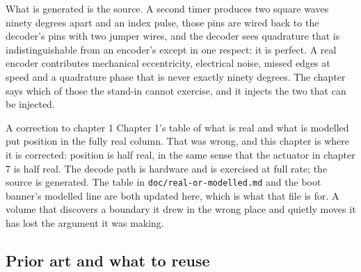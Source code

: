 What is generated is the source. A second timer produces two square waves ninety
degrees apart and an index pulse, those pins are wired back to the decoder's
pins with two jumper wires, and the decoder sees quadrature that is
indistinguishable from an encoder's except in one respect: it is perfect. A real
encoder contributes mechanical eccentricity, electrical noise, missed edges at
speed and a quadrature phase that is never exactly ninety degrees. The chapter
says which of those the stand-in cannot exercise, and it injects the two that
can be injected.

\begin{note}{A correction to chapter 1}
Chapter 1's table of what is real and what is modelled put position in the
fully real column. That was wrong, and this chapter is where it is corrected:
position is half real, in the same sense that the actuator in chapter 7 is half
real. The decode path is hardware and is exercised at full rate; the source is
generated. The table in \texttt{doc/real-or-modelled.md} and the boot banner's
modelled line are both updated here, which is what that file is for. A volume
that discovers a boundary it drew in the wrong place and quietly moves it has
lost the argument it was making.
\end{note}

\subsection*{Prior art and what to reuse}

